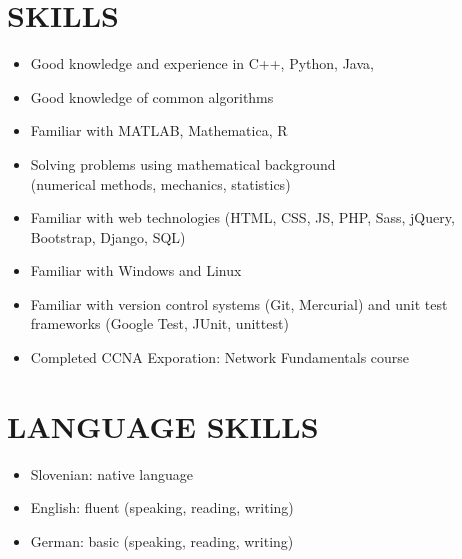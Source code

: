 \documentclass[line,margin]{res}
\begin{document}

\section{SKILLS}
\begin{itemize}
  \item Good knowledge and experience in C++, Python, Java,
  \item Good knowledge of common algorithms
  \item Familiar with MATLAB, Mathematica, R
  \item Solving problems using mathematical background
  \\ (numerical methods, mechanics, statistics)
  \item Familiar with web technologies (HTML, CSS, JS, PHP, Sass, jQuery, Bootstrap,
  Django, SQL)
  \item Familiar with Windows and Linux
  \item Familiar with version control systems (Git, Mercurial) and unit test
  frameworks (Google Test, JUnit, unittest)
  \item Completed CCNA Exporation: Network Fundamentals course
\end{itemize}


\section{LANGUAGE SKILLS}
\begin{itemize}
  \item Slovenian: native language
  \item English: fluent (speaking, reading, writing)
  \item German: basic (speaking, reading, writing)
\end{itemize}
\end{document}
